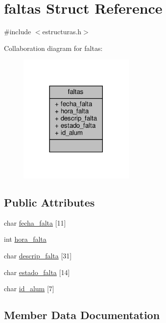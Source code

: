 \hypertarget{structfaltas}{}\section{faltas Struct Reference}
\label{structfaltas}


{\ttfamily \#include $<$estructuras.\+h$>$}



Collaboration diagram for faltas\+:\nopagebreak
\begin{figure}[H]
\begin{center}
\leavevmode
\includegraphics[width=161pt]{structfaltas__coll__graph}
\end{center}
\end{figure}
\subsection*{Public Attributes}
\begin{DoxyCompactItemize}
\item 
char \mbox{\hyperlink{structfaltas_af129c434d523f950657f329ee13598b5}{fecha\+\_\+falta}} \mbox{[}11\mbox{]}
\item 
int \mbox{\hyperlink{structfaltas_a896bc2033259f82ae633907298b3a65d}{hora\+\_\+falta}}
\item 
char \mbox{\hyperlink{structfaltas_a4c7f9998f31cf6251caa0216c7639b24}{descrip\+\_\+falta}} \mbox{[}31\mbox{]}
\item 
char \mbox{\hyperlink{structfaltas_abcd66e5b1e7f572c68cfc2d860289ee3}{estado\+\_\+falta}} \mbox{[}14\mbox{]}
\item 
char \mbox{\hyperlink{structfaltas_adf78bf54f25af0e394df78fc3ef765fa}{id\+\_\+alum}} \mbox{[}7\mbox{]}
\end{DoxyCompactItemize}


\subsection{Member Data Documentation}
\mbox{\label{structfaltas_a4c7f9998f31cf6251caa0216c7639b24}} 
